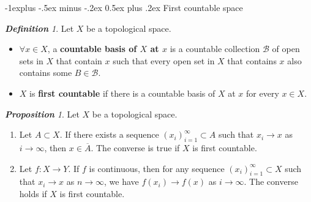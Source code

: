 \documentclass[frenchspacing,9pt,landscape,a4paper]{article}
\makeatletter
\renewcommand{\subsection}{\@startsection{subsection}{2}{0mm}%
                                {-1explus -.5ex minus -.2ex}%
                                {0.5ex plus .2ex}%
                                {\normalfont\normalsize\bfseries}}
\theoremstyle{remark}
\newtheorem*{defn}{\textbf{Definition}}
\newtheorem*{prop}{\textbf{Proposition}}
\makeatother
\begin{document}
\begin{multicols}{4}
\subsection{First countable space}
\begin{defn}
    Let $X$ be a topological space.
     \begin{itemize}
         \item $\forall x\in X$, a \textbf{countable basis of $X$ at  $x$} is a countable collection
             $\mathcal{B}$ of open sets in  $X$ that contain  $x$ such that every open set in  $X$ that
             contains  $x$ also contains some  $B\in\mathcal{B}$.
         \item  $X$ is \textbf{first countable} if there is a countable basis of  $X$ at  $x$ for every
             $x\in X$.
    \end{itemize}
\end{defn}
\begin{prop}
    Let $X$ be a topological space.
     \begin{enumerate}
         \item Let $A\subset X$. If there exists a sequence  $(x_i)_{i=1}^\infty\subset A$ such that
             $x_i\to x$ as  $i\to\infty$, then  $x\in\overline{A}$. The converse is true if  $X$ is first
             countable.
         \item Let  $f:X\to Y$. If  $f$ is continuous, then for any sequence  $(x_i)_{i=1}^\infty\subset X$
             such that  $x_i\to x$ as  $n\to\infty$, we have  $f(x_i)\to f(x)$ as  $i\to\infty$. The
             converse holds if  $X$ is first countable.
    \end{enumerate}
\end{prop}

\end{multicols}
\end{document}

